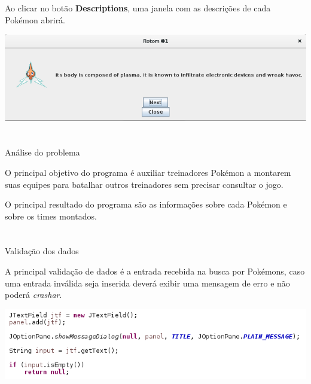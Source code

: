 \documentclass[
	article,			%
	12pt,				%
	oneside,			%
	a4paper,			%
	english,			%
	brazil,				%
	sumario=tradicional
	]{abntex2}
\begin{document}
Ao clicar no botão \textbf{Descriptions}, uma janela com as descrições de cada Pokémon abrirá.

\begin{center}
\includegraphics[width=1\textwidth]{description}\par
\end{center}


\newpage
\section*{}

\begin{center}
{\HUGE Análise do problema}
\end{center}

O principal objetivo do programa é auxiliar treinadores Pokémon a montarem suas equipes para batalhar outros treinadores sem precisar consultar o jogo.

O principal resultado do programa são as informações sobre cada Pokémon e sobre os times montados.

\section*{}

\begin{center}
{\HUGE Validação dos dados}
\end{center}

A principal validação de dados é a entrada recebida na busca por Pokémons, caso uma entrada inválida seja inserida deverá exibir uma mensagem de erro e não poderá \textit{crashar}.

\begin{center}
\includegraphics[width=1\textwidth]{tratamento_input}\par
\end{center}
\end{document}
